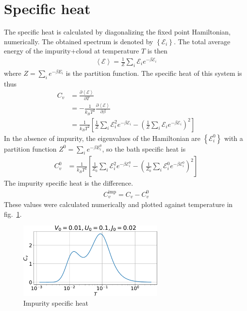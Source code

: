 \documentclass[12pt,twoside]{report}
\numberwithin{equation}{section}
\begin{document}
\section{Specific heat}
The specific heat is calculated by diagonalizing the fixed point Hamiltonian, numerically. The obtained spectrum is denoted by \(\left\{ \mathcal{E}_i \right\} \). The total average energy of the impurity+cloud at temperature \(T\) is then
\begin{equation}\begin{aligned}
	\left<\mathcal{E} \right> = \frac{1}{Z}\sum_{i} \mathcal{E}_i e^{-\beta \mathcal{E}_i}
\end{aligned}\end{equation}
where \(Z = \sum_{i} e^{-\beta E_i}\) is the partition function. The specific heat of this system is thus
\begin{equation}\begin{aligned}
	C_v &= \frac{\partial{\left<\mathcal{E} \right>}}{\partial{T}} \\
	    &= -\frac{1}{k_B T^2} \frac{\partial{\left<\mathcal{E} \right>}}{\partial{\beta}} \\
	    &= \frac{1}{k_B T^2}\left[\frac{1}{Z}\sum_i \mathcal{E}_i^2 e^{-\beta \mathcal{E}_i} - \left(\frac{1}{Z}\sum_i \mathcal{E}_i e^{-\beta \mathcal{E}_i}\right)^2 \right] 
\end{aligned}\end{equation}
In the absence of impurity, the eigenvalues of the Hamiltonian are \(\left\{\mathcal{E}_i^0\right\}\) with a partition function \(Z^0 = \sum_{i} e^{-\beta E_i^0}\), so the bath specific heat is
\begin{equation}\begin{aligned}
	C_v^0 &= \frac{1}{k_B T^2}\left[\frac{1}{Z_0}\sum_i \mathcal{E}_i^2 e^{-\beta \mathcal{E}_i^0} - \left(\frac{1}{Z_0}\sum_i \mathcal{E}_i^0 e^{-\beta \mathcal{E}_i^0}\right)^2 \right] 
\end{aligned}\end{equation}
The impurity specific heat is the difference.
\begin{equation}\begin{aligned}
	C_v^\text{imp} = C_v - C_v^0
\end{aligned}\end{equation}
These values were calculated numerically and plotted against temperature in fig.~\ref{cv}.
\begin{figure}[htpb]
	\centering
	\includegraphics[width=0.65\textwidth]{../figures/Cv.pdf}
	\caption{Impurity specific heat}
	\label{cv}
\end{figure}
\end{document}
